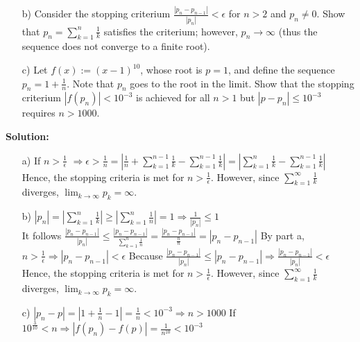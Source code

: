 \documentclass[12pt]{article}
\begin{document}
\begin{enumerate}[label=\bfseries Problem \arabic*:]
\begin{itemize}
    
    \item[b)] Consider the stopping criterium $\frac{|p_{n}-p_{n-1}|}{|p_n|}< \epsilon$ for $n>2$ and $p_n\neq 0$. Show that $p_n=\sum_{k=1}^n \frac{1}{k}$ satisfies the criterium; however, $p_n \rightarrow \infty$ (thus the sequence does not converge to a finite root).
    
     
    \item[c)] Let  $f(x):=(x-1)^{10}$, whose root is $p=1$, and define the sequence $p_n=1+\frac{1}{n}$. Note that $p_n$ goes to the root in the limit. Show that the stopping criterium $|f(p_n)| < 10^{-3}$ is achieved for all $n>1$ but $|p-p_n|\leq 10^{-3}$ requires $n>1000$.
     
     
    \end{itemize}
    
    \textbf{Solution:}

    \begin{itemize}
    \item[a)] If $n>\frac{1}{\epsilon}$ \newline
    $\Rightarrow\epsilon>\frac{1}{n}=|\frac{1}{n}+\sum_{k=1}^{n-1}\frac{1}{k}-\sum_{k=1}^{n-1}\frac{1}{k}|=|\sum_{k=1}^{n}\frac{1}{k}-\sum_{k=1}^{n-1}\frac{1}{k}|$ \newline
    Hence, the stopping criteria is met for $n>\frac{1}{\epsilon}$. However, since $\sum_{k=1}^{\infty}\frac{1}{k}$ diverges, $\displaystyle{\lim_{k \to \infty}}p_k=\infty$.
    \item[b)] $|p_n|=|\sum_{k=1}^{n}\frac{1}{k}|\ge|\sum_{k=1}^{n}\frac{1}{n}|=1\Rightarrow \frac{1}{|p_n|}\le 1$\\
    It follows $\frac{|p_{n}-p_{n-1}|}{|p_n|}\le\frac{|p_{n}-p_{n-1}|}{\sum_{k=1}^{n}\frac{1}{n}}=\frac{|p_{n}-p_{n-1}|}{\frac{n}{n}}=|p_{n}-p_{n-1}|$ \newline
    By part a, $n>\frac{1}{\epsilon}\Rightarrow|p_{n}-p_{n-1}|<\epsilon$ \newline
    Because $\frac{|p_{n}-p_{n-1}|}{|p_n|}\le |p_{n}-p_{n-1}|\Rightarrow\frac{|p_{n}-p_{n-1}|}{|p_n|}<\epsilon$ \newline
    Hence, the stopping criteria is met for $n>\frac{1}{\epsilon}$. However, since $\sum_{k=1}^{\infty}\frac{1}{k}$ diverges, $\displaystyle{\lim_{k \to \infty}}p_k=\infty$.
    \item[c)] $|p_n-p|=|1+\frac{1}{n}-1|=\frac{1}{n}<10^{-3}\Rightarrow n>1000$ \newline
    If $10^{\frac{3}{10}}<n\Rightarrow|f(p_n)-f(p)|=\frac{1}{n^{10}}<10^{-3}$

    \end{itemize}
    
    \end{enumerate}
\end{document}
